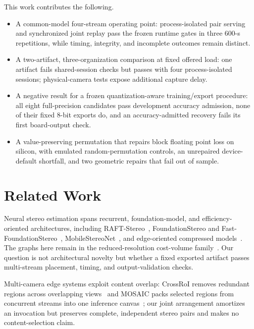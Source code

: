 \documentclass[sigconf,review,anonymous]{acmart}
\begin{document}
This work contributes the following.
\begin{itemize}
\item A common-model four-stream operating point: process-isolated pair serving and synchronized joint replay pass the frozen runtime gates in three 600-s repetitions, while timing, integrity, and incomplete outcomes remain distinct.
\item A two-artifact, three-organization comparison at fixed offered load: one artifact fails shared-session checks but passes with four process-isolated sessions; physical-camera tests expose additional capture delay.
\item A negative result for a frozen quantization-aware training/export procedure: all eight full-precision candidates pass development accuracy admission, none of their fixed 8-bit exports do, and an accuracy-admitted recovery fails its first board-output check.
\item A value-preserving permutation that repairs block floating point loss on silicon, with emulated random-permutation controls, an unrepaired device-default shortfall, and two geometric repairs that fail out of sample.
\end{itemize}

\section{Related Work}
\label{sec:related}
Neural stereo estimation spans recurrent, foundation-model, and efficiency-oriented architectures, including RAFT-Stereo~\cite{raftstereo}, FoundationStereo and Fast-FoundationStereo~\cite{foundationstereo,fastfoundationstereo}, MobileStereoNet~\cite{shamsafar2022mobilestereonet}, and edge-oriented compressed models~\cite{rbq_pan2024distillprune,rbq_liang2026rcaenet}. The graphs here remain in the reduced-resolution cost-volume family~\cite{rbq_tankovich2021hitnet,rbq_guo2025lightstereo}. Our question is not architectural novelty but whether a fixed exported artifact passes multi-stream placement, timing, and output-validation checks.

Multi-camera edge systems exploit content overlap: CrossRoI removes redundant regions across overlapping views~\cite{guo2021crossroi} and MOSAIC packs selected regions from concurrent streams into one inference canvas~\cite{gokarn2023mosaic}; our joint arrangement amortizes an invocation but preserves complete, independent stereo pairs and makes no content-selection claim.
\end{document}
